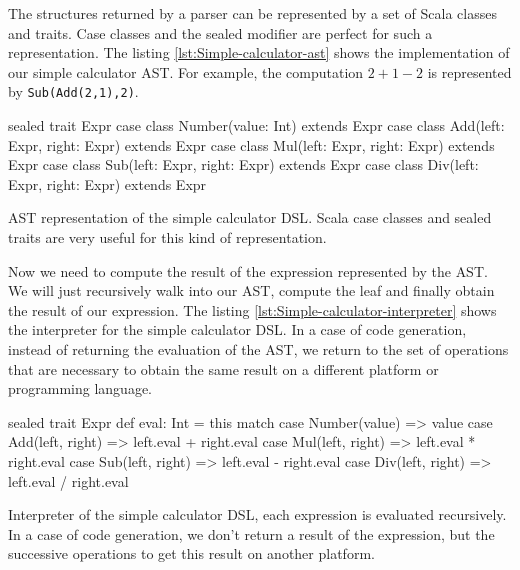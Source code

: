 The structures returned by a parser can be represented by a set of Scala classes
and traits. Case classes and the sealed modifier are perfect for such a
representation. The listing \ref{lst:Simple-calculator-ast} shows the
implementation of our simple calculator \gls{AST}. For example, the computation
$2 + 1 - 2$ is represented by \verb|Sub(Add(2,1),2)|.

\begin{listing}[ht]
\centering
\begin{scalacode}
sealed trait Expr
case class Number(value: Int) extends Expr
case class Add(left: Expr, right: Expr) extends Expr
case class Mul(left: Expr, right: Expr) extends Expr
case class Sub(left: Expr, right: Expr) extends Expr
case class Div(left: Expr, right: Expr) extends Expr
\end{scalacode}
\caption[\gls{AST} representation of the simple calculator \gls{DSL}]{\gls{AST}
representation of the simple calculator \gls{DSL}. Scala case classes and sealed
traits are very useful for this kind of representation.}
\label{lst:Simple-calculator-ast}
\end{listing}

Now we need to compute the result of the expression represented by the
\gls{AST}. We will just recursively walk into our AST, compute the
leaf and finally obtain the result of our expression. The listing
\ref{lst:Simple-calculator-interpreter} shows the interpreter for the simple
calculator \gls{DSL}. In a case of code generation, instead of returning the
evaluation of the \gls{AST}, we return to the set of operations that are necessary
to obtain the same result on a different platform or programming language.

\begin{listing}[ht]
\centering
\begin{scalacode}
sealed trait Expr {
  def eval: Int = this match {
    case Number(value) => value
    case Add(left, right) => left.eval + right.eval
    case Mul(left, right) => left.eval * right.eval
    case Sub(left, right) => left.eval - right.eval
    case Div(left, right) => left.eval / right.eval
  }
}
\end{scalacode}
\caption[Interpreter of the simple calculator \gls{DSL}]{Interpreter of the
simple calculator \gls{DSL}, each expression is evaluated recursively. In a case
of code generation, we don't return a result of the expression, but the
successive operations to get this result on another platform.}
\label{lst:Simple-calculator-interpreter}
\end{listing}

